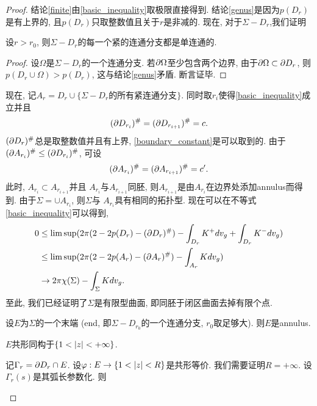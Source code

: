 \begin{proof}
    结论\eqref{finite}由\eqref{basic_inequality}取极限直接得到. 结论\eqref{genus}是因为$p(D_r)$是有上界的, 且$p(D_r)$只取整数值且关于$r$是非减的. 现在, 对于$\Sigma - D_r$,我们证明
    \begin{claim}
        设$r > r_0$, 则$\Sigma - D_r$的每一个紧的连通分支都是单连通的.
        \begin{proof}
            设$\Omega$是$\Sigma - D_r$的一个连通分支. 若$\P \Omega$至少包含两个边界, 由于$\P \Omega \subset \P D_r$, 则$p(D_r \cup \Omega) > p(D_r)$, 这与结论\eqref{genus}矛盾. 断言证毕.
        \end{proof}
    \end{claim}
    \par 现在, 记$A_r=D_r\cup \{\Sigma - D_r\text{的所有紧连通分支}\}$. 同时取$r_i$使得\eqref{basic_inequality}成立并且
    \begin{equation} \label{boundary_constant}
        (\P D_{r_i})^\# = (\P D_{r_{i+1}})^\#=c.
    \end{equation}
    $(\P D_{r})^\#$总是取整数值并且有上界, \eqref{boundary_constant}是可以取到的. 由于$(\P A_{r_i})^\# \le (\P D_{r_i})^\#$, 可设
    \begin{equation}
        (\P A_{r_i})^\# = (\P A_{r_{i+1}})^\#=c'.
    \end{equation}
    此时, $A_{r_i} \subset A_{r_{i+1}}$并且 $A_{r_i}$与$A_{r_{i+1}}$同胚, 则$A_{r_{i+1}}$是由$A_{r_i}$在边界处添加annulus而得到. 由于$\Sigma = \cup A_{r_i}$, 则$\Sigma$与 $A_{r_i}$具有相同的拓扑型. 现在可以在不等式\eqref{basic_inequality}可以得到,
    \begin{equation}
        \begin{split}
            0 & \le \limsup (2\pi(2-2p(D_r)-(\P D_r)^\#)-\int_{D_r}K^+dv_g+\int_{D_r}K^-dv_g) \\
            &\le  \limsup (2\pi(2-2p(A_r)-(\P A_r)^\#)-\int_{A_r}Kdv_g) \\
            & \to  2\pi \chi(\Sigma) - \int_\Sigma K dv_g.
        \end{split}
    \end{equation}
    至此, 我们已经证明了$\Sigma$是有限型曲面, 即同胚于闭区曲面去掉有限个点.
    \par 设$E$为$\Sigma$的一个末端 (end, 即$\Sigma-D_{r_0}$的一个连通分支, $r_0$取足够大). 则$E$是annulus. 
    \begin{claim}
        $E$共形同构于$\{1 < \abs{z} < +\infty\}$.
        \begin{subproof}
            记$\Gamma_r=\P D_r \cap E$. 设$\phi: E \to \{ 1 < \abs{z} < R\}$是共形等价. 我们需要证明$R=+\infty$. 设$\Gamma_r(s)$是其弧长参数化. 则

\end{subproof}
\end{claim}
\end{proof}
